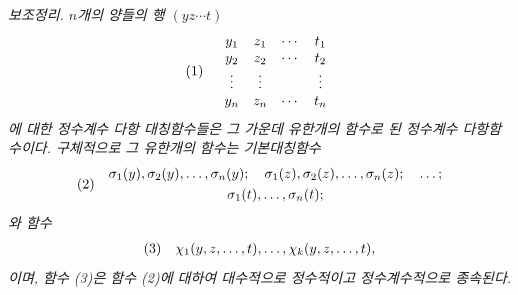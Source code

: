 
\emph{보조정리. $n$개의 양들의 행 $(yz\cdots t)$}
\[
\begin{array}{@{}l@{\quad}c@{}}
(1)&
\begin{array}{cccc}
  y_1&z_1&\cdots&t_1\\
  y_2&z_2&\cdots&t_2\\
  \vdots&\vdots&&\vdots\\
  y_n&z_n&\cdots&t_n
\end{array}
\end{array}
\]
\emph{에 대한 정수계수 다항 대칭함수들은 그 가운데 유한개의 함수로 된 정수계수 다항함수이다. 구체적으로 그 유한개의 함수는 기본대칭함수}
\[
\begin{array}{@{}l@{\quad}c@{}}
(2)&
\begin{gathered}
  \sigma_1(y),\sigma_2(y),\ldots,\sigma_n(y);\quad
  \sigma_1(z),\sigma_2(z),\ldots,\sigma_n(z);\quad\ldots;\\
  \sigma_1(t),\ldots,\sigma_n(t);
\end{gathered}
\end{array}
\]
\emph{와 함수}
\[
\begin{array}{@{}l@{\quad}c@{}}
(3)&
  \chi_1(y,z,\ldots,t),\ldots,\chi_k(y,z,\ldots,t),
\end{array}
\]
\emph{이며, 함수 (3)은 함수 (2)에 대하여 대수적으로 정수적이고 정수계수적으로 종속된다.}
